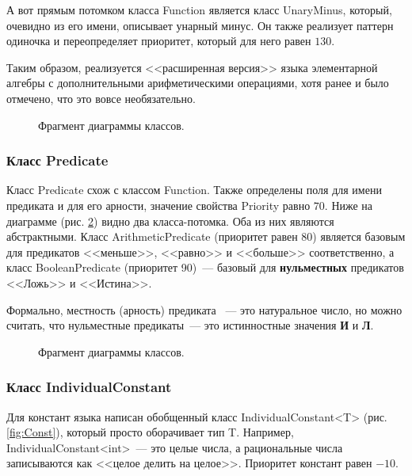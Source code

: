А вот прямым потомком класса Function является класс UnaryMinus, который, очевидно из его имени, описывает унарный минус. Он также реализует паттерн одиночка и переопределяет приоритет, который для него равен $130$.

Таким образом, реализуется <<расширенная версия>> языка элементарной алгебры с дополнительными арифметическими операциями, хотя ранее и было отмечено, что это вовсе необязательно.

\begin{figure}[h]
    \caption{Фрагмент диаграммы классов.}
    \label{fig:Function-inh}
\end{figure}

\subsubsection{Класс Predicate}

Класс Predicate схож с классом Function. Также определены поля для имени предиката и для его арности, значение свойства Priority равно $70$. Ниже на диаграмме (рис. \ref{fig:Predicate}) видно два класса-потомка. Оба из них являются абстрактными. Класс ArithmeticPredicate (приоритет равен 80) является базовым для предикатов <<меньше>>, <<равно>> и <<больше>> соответственно, а класс BooleanPredicate (приоритет 90)~--- базовый для \textbf{нульместных} предикатов <<Ложь>> и <<Истина>>.

    Формально, местность (арность) предиката ~--- это натуральное число, но можно считать, что нульместные предикаты~--- это истинностные значения \textbf{И} и \textbf{Л}.

\begin{figure}[h]
    \caption{Фрагмент диаграммы классов.}
    \label{fig:Predicate}
\end{figure}

\subsubsection{Класс IndividualConstant}

Для констант языка написан обобщенный класс IndividualConstant<T> (рис. \ref{fig:Const}), который просто оборачивает тип T. Например, IndividualConstant<int>~--- это целые числа, а рациональные числа записываются как <<целое делить на целое>>. Приоритет констант равен $-10$.

